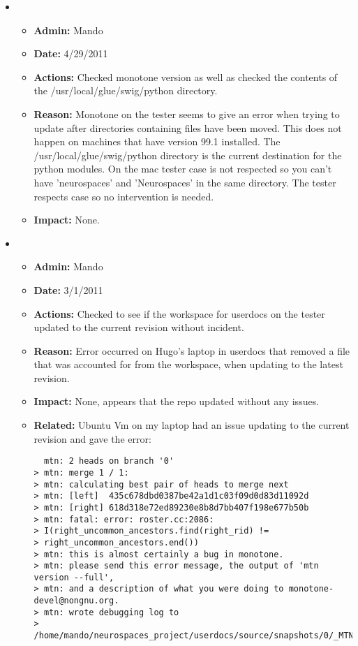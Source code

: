 \documentclass[12pt]{article}
\begin{document}
\begin{itemize}


\item
  \begin{itemize}
  \item[] {\bf Admin:} Mando
  \item[] {\bf Date:} 4/29/2011 
  \item[] {\bf Actions:} Checked monotone version as well as checked the contents of the /usr/local/glue/swig/python directory.
  \item[] {\bf Reason:} Monotone on the tester seems to give an error when trying to update after directories containing files have been moved. This does not happen
  on machines that have version 99.1 installed. The /usr/local/glue/swig/python directory is the current destination for the python modules. On the mac tester 
  case is not respected so you can't have 'neurospaces' and 'Neurospaces' in the same directory. The tester respects case so no intervention is needed. 
  \item[] {\bf Impact:} None.
  \end{itemize}


\item
  \begin{itemize}
  \item[] {\bf Admin:} Mando
  \item[] {\bf Date:} 3/1/2011 
  \item[] {\bf Actions:} Checked to see if the workspace for userdocs on the tester updated to the current revision without incident.
  \item[] {\bf Reason:} Error occurred on Hugo's laptop in userdocs that removed a file that was accounted for from the workspace, when
  updating to the latest revision. 
  \item[] {\bf Impact:} None, appears that the repo updated without any issues. 
  \item[] {\bf Related:} Ubuntu Vm on my laptop had an issue updating to the current revision and gave the error:
  
  \begin{verbatim}
  mtn: 2 heads on branch '0'
> mtn: merge 1 / 1:
> mtn: calculating best pair of heads to merge next
> mtn: [left]  435c678dbd0387be42a1d1c03f09d0d83d11092d
> mtn: [right] 618d318e72ed89230e8b8d7bb407f198e677b50b
> mtn: fatal: error: roster.cc:2086:
> I(right_uncommon_ancestors.find(right_rid) !=
> right_uncommon_ancestors.end())
> mtn: this is almost certainly a bug in monotone.
> mtn: please send this error message, the output of 'mtn version --full',
> mtn: and a description of what you were doing to monotone-devel@nongnu.org.
> mtn: wrote debugging log to
> /home/mando/neurospaces_project/userdocs/source/snapshots/0/_MTN/debug
  \end{verbatim}
  

\end{itemize}
\end{itemize}
\end{document}
